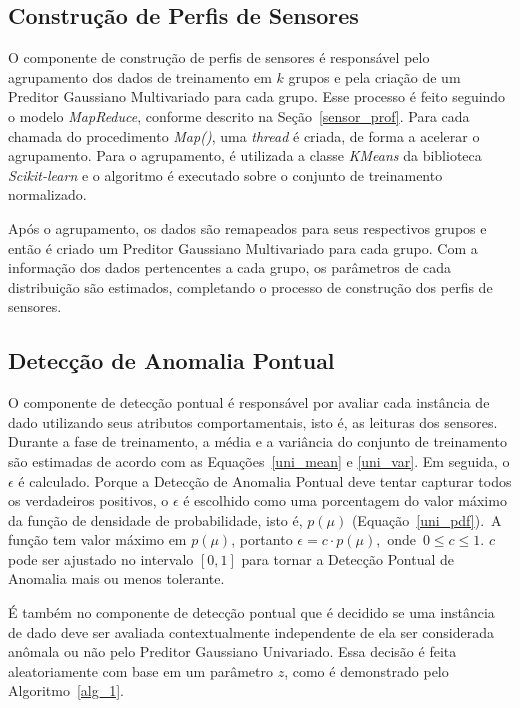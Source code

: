 \documentclass[cic,tc]{iiufrgs}
\begin{document}
\subsection{Construção de Perfis de Sensores}
\label{construcao_sp}
O componente de construção de perfis de sensores é responsável pelo agrupamento dos dados de treinamento em $k$ grupos e pela criação de um Preditor Gaussiano Multivariado para cada grupo. Esse processo é feito seguindo o modelo \textit{MapReduce}, conforme descrito na Seção~\ref{sensor_prof}. Para cada chamada do procedimento \textit{Map()}, uma \textit{thread} é criada, de forma a acelerar o agrupamento. Para o agrupamento, é utilizada a classe \textit{KMeans} da biblioteca \textit{Scikit-learn} e o algoritmo é executado sobre o conjunto de treinamento normalizado.

Após o agrupamento, os dados são remapeados para seus respectivos grupos e então é criado um Preditor Gaussiano Multivariado para cada grupo. Com a informação dos dados pertencentes a cada grupo, os parâmetros de cada distribuição são estimados, completando o processo de construção dos perfis de sensores.

\subsection{Detecção de Anomalia Pontual}
\label{sistema_pont}
O componente de detecção pontual é responsável por avaliar cada instância de dado utilizando seus atributos comportamentais, isto é, as leituras dos sensores. Durante a fase de treinamento, a média e a variância do conjunto de treinamento são estimadas de acordo com as Equações~\ref{uni_mean} e \ref{uni_var}. Em seguida, o $\epsilon$ é calculado. Porque a Detecção de Anomalia Pontual deve tentar capturar todos os verdadeiros positivos, o $\epsilon$ é escolhido como uma porcentagem do valor máximo da função de densidade de probabilidade, isto é, $p(\mu)$ (Equação~\ref{uni_pdf}).~A função tem valor máximo em $p(\mu)$, portanto $\epsilon = c \cdot p(\mu)$,~onde~$0 \leq c \leq 1$. $c$ pode ser ajustado no intervalo $[0,1]$ para tornar a Detecção Pontual de Anomalia mais ou menos tolerante.

É também no componente de detecção pontual que é decidido se uma instância de dado deve ser avaliada contextualmente independente de ela ser considerada anômala ou não pelo Preditor Gaussiano Univariado. Essa decisão é feita aleatoriamente com base em um parâmetro $z$, como é demonstrado pelo Algoritmo~\ref{alg_1}.
\end{document}
